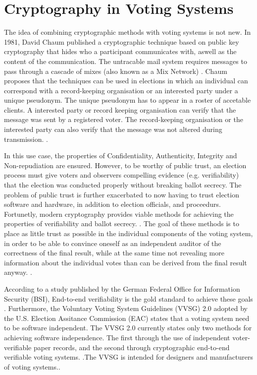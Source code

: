 \section{Cryptography in Voting Systems}
The idea of combining cryptographic methods with voting systems is not new. In 1981, David Chaum published a cryptographic technique based on public key cryptography that hides who a participant communicates with, aswell as the content of the communication. The untracable mail system requires messages to pass through a cascade of mixes (also known as a Mix Network) \cite[86]{chaum}. Chaum proposes that the techniques can be used in elections in which an individual can correspond with a record-keeping organisation or an interested party under a unique pseudonym. The unique pseudonym has to appear in a roster of accetable clients. A interested party or record keeping organisation can verify that the message was sent by a registered voter. The record-keeping organisation or the interested party can also verify that the message was not altered during transmission. \cite[84]{chaum}. 

In this use case, the properties of Confidentiality, Authenticity, Integrity and Non-repudiation are ensured. However, to be worthy of public trust, an election process must give voters and observers compelling evidence (e.g. verifiability) that the election was conducted properly without breaking ballot secrecy. The problem of public trust is further exacerbated to now having to trust election software and hardware, in addition to election officials, and proceedurs. Fortunetly, modern cryptography provides viable methods for achieving the properties of verifiability and ballot secrecy. \cite[6]{stuve-studys}. The goal of these methods is to place as little trust as possible in the individual components of the voting system, in order to be able to convince oneself as an independent auditor of the correctness of the final result, while at the same time not revealing more information about the individual votes than can be derived from the final result anyway. \cite[6, 10]{stuve-studys}.

According to a study published by the German Federal Office for Information Security (BSI), End-to-end verifiability is the gold standard to achieve these goals \cite[10]{stuve-studys}. Furthermore, the Voluntary Voting System Guidelines (VVSG) 2.0 adopted by the U.S. Election Assitance Commission (EAC) states that a voting system need to be software independent. The VVSG 2.0 currently states only two methods for achieving software independence. The first through the use of independent voter-verifiable paper records, and the second through cryptographic end-to-end verifiable voting systems. \cite[181]{vvsg}.The VVSG is intended for designers and manufacturers of voting systems.\cite{vvsg-intro}.

